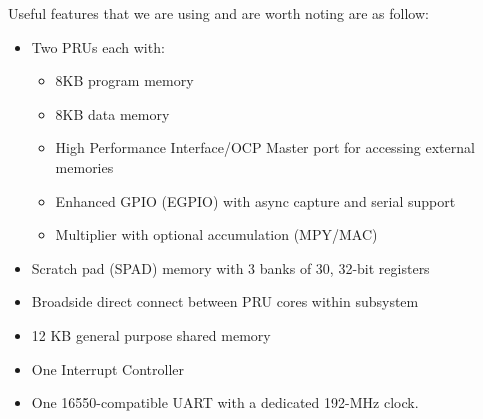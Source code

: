 Useful features that we are using and are worth noting are as follow:
\begin{itemize}
	\item Two PRUs each with:
	\begin{itemize}
		\item 8KB program memory
		\item 8KB data memory
		\item High Performance Interface/OCP Master port for accessing external memories
		\item Enhanced GPIO (EGPIO) with async capture and serial support
		\item Multiplier with optional accumulation (MPY/MAC)		
	\end{itemize}
	\item Scratch pad (SPAD) memory with 3 banks of 30, 32-bit registers 
	\item Broadside direct connect between PRU cores within subsystem
	\item 12 KB general purpose shared memory
	\item One Interrupt Controller
	\item One 16550-compatible UART with a dedicated 192-MHz clock.
\end{itemize} 

